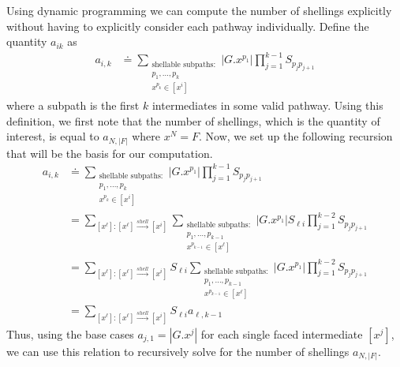 Using dynamic programming we can compute the number of shellings explicitly without having to explicitly consider each pathway individually. Define the quantity $a_{ik}$ as
\begin{align}
a_{i,k} &\doteq  \sum_{\substack{\text{shellable subpaths}:\\ p_1, \dots, p_k \\ x^{p_k} \in [x^i]}}|G.x^{p_1}|\prod_{j=1}^{k-1}S_{p_j p_{j+1}} \end{align}
where a subpath is the first $k$ intermediates in some valid pathway. Using this definition, we first note that the number of shellings, which is the quantity of interest, is equal to $a_{N,|F|}$ where $x^N = F$. Now, we set up the following recursion that will be the basis for our computation. 
\begin{align}
a_{i,k} &\doteq \sum_{\substack{\text{shellable subpaths}:\\ p_1, \dots, p_k \\ x^{p_k} \in [x^i]}}|G.x^{p_1}|\prod_{j=1}^{k-1}S_{p_j p_{j+1}} \\  
&= \sum_{[x^\ell]:[x^\ell]\xrightarrow{shell}[x^i]} \sum_{\substack{\text{shellable subpaths}:\\ p_1, \dots, p_{k-1} \\ x^{p_{k-1}} \in [x^\ell]}}|G.x^{p_1}|S_{\ell i}\prod_{j=1}^{k-2}S_{p_j p_{j+1}} \\
&= \sum_{[x^\ell]:[x^\ell]\xrightarrow{shell}[x^i]} S_{\ell i} \sum_{\substack{\text{shellable subpaths}:\\ p_1, \dots, p_{k-1} \\ x^{p_{k-1}} \in [x^\ell]}}|G.x^{p_1}|\prod_{j=1}^{k-2}S_{p_j p_{j+1}} \\
&= \sum_{[x^\ell]:[x^\ell]\xrightarrow{shell}[x^i]} S_{\ell i} a_{\ell, k-1}
\end{align}
Thus, using the base cases $a_{j,1} = |G.x^j|$ for each single faced intermediate $[x^j]$, we can use this relation to recursively solve for the number of shellings $a_{N,|F|}$.

